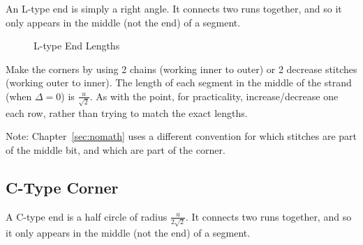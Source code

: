 \documentclass[openany]{book}
\begin{document}
An L-type end is simply a right angle. It connects two runs together, and so it only appears in the middle (not the end) of a segment.

\begin{figure}[H]\centering
{}\caption{L-type End Lengths}
\end{figure}

Make the corners by using 2 chains (working inner to outer) or 2 decrease stitches (working outer to inner). The length of each segment in the middle of the strand (when $\Delta=0$) is $\frac{u}{\sqrt 2}$. As with the point, for practicality, increase/decrease one each row, rather than trying to match the exact lengths.

Note: Chapter~\ref{sec:nomath} uses a different convention for which stitches are part of the middle bit, and which are part of the corner.

\subsection{C-Type Corner}\label{sssec:c}

A C-type end is a half circle of radius $\frac{u}{2\sqrt 2}$. It connects two runs together, and so it only appears in the middle (not the end) of a segment.
\end{document}
